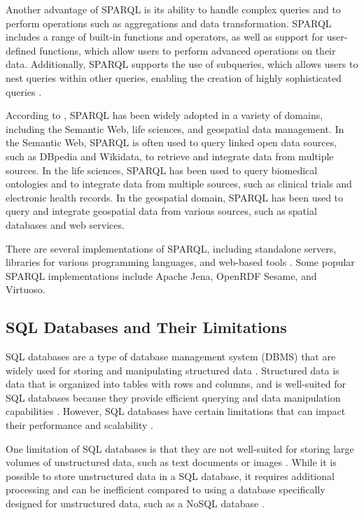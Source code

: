 Another advantage of SPARQL is its ability to handle complex queries and to perform operations such as aggregations and data transformation.  SPARQL includes a range of built-in functions and operators, as well as support for user-defined functions, which allow users to perform advanced operations on their data.  Additionally, SPARQL supports the use of subqueries, which allows users to nest queries within other queries, enabling the creation of highly sophisticated queries \citep{allemang2011semantic}.

According to \citep{allemang2011semantic}, SPARQL has been widely adopted in a variety of domains, including the Semantic Web, life sciences, and geospatial data management.  In the Semantic Web, SPARQL is often used to query linked open data sources, such as DBpedia and Wikidata, to retrieve and integrate data from multiple sources.  In the life sciences, SPARQL has been used to query biomedical ontologies and to integrate data from multiple sources, such as clinical trials and electronic health records.  In the geospatial domain, SPARQL has been used to query and integrate geospatial data from various sources, such as spatial databases and web services.

There are several implementations of SPARQL, including standalone servers, libraries for various programming languages, and web-based tools \citep{sparql22i}.  Some popular SPARQL implementations include Apache Jena, OpenRDF Sesame, and Virtuoso.

\subsection{SQL Databases and Their Limitations}
SQL databases are a type of database management system (DBMS) that are widely used for storing and manipulating structured data \citep{garcia2008database}.  Structured data is data that is organized into tables with rows and columns, and is well-suited for SQL databases because they provide efficient querying and data manipulation capabilities \citep{ramez2016fundamentals}.  However, SQL databases have certain limitations that can impact their performance and scalability \citep{chen2014data}.

One limitation of SQL databases is that they are not well-suited for storing large volumes of unstructured data, such as text documents or images \citep{chen2014data}.  While it is possible to store unstructured data in a SQL database, it requires additional processing and can be inefficient compared to using a database specifically designed for unstructured data, such as a NoSQL database \citep{kleppmann2019designing}.

